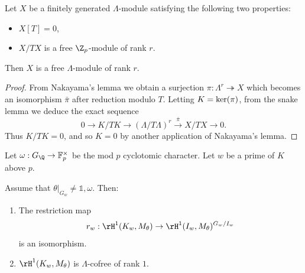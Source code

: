 \begin{lemma}
\notready\label{lem:commalg}
Let $X$ be a finitely generated $\Lambda$-module satisfying the following two properties:
\begin{itemize}
\item $X[T]=0$,
\item $X/TX$ is a free $\Z_p$-module of rank $r$.
\end{itemize}
Then $X$ is a free $\Lambda$-module of rank $r$.
\end{lemma}

\begin{proof}
From Nakayama's lemma we obtain a surjection $\pi:\Lambda^r\twoheadrightarrow X$ which becomes an isomorphism $\bar{\pi}$ after reduction modulo $T$. Letting $K={\rm ker}(\pi)$, from the snake lemma we deduce the exact sequence
\[
0\rightarrow K/TK\rightarrow(\Lambda/T\Lambda)^r\xrightarrow{\bar{\pi}}X/TX\rightarrow 0.
\]
Thus $K/TK=0$, and so $K=0$ by another application of Nakayama's lemma.
\end{proof}

Let $\omega:G_\Q\rightarrow \mathbb{F}_p^\times$ be the mod $p$ cyclotomic character.
Let $w$ be a prime of $K$ above $p$.

\begin{prop}
\notready\label{propw=v}
Assume that $\theta\vert_{G_w}\neq\mathds{1},\omega$. Then:
\begin{enumerate}
\item[(i)] The restriction map
\[
r_w:\rH^1(K_w,M_\theta)\rightarrow\rH^1(I_w,M_\theta)^{G_w/I_w}
\]
is an isomorphism. %
\item[(ii)] $\rH^1(K_w,M_{\theta})$ is $\Lambda$-cofree of rank $1$.
\end{enumerate}
\end{prop}

